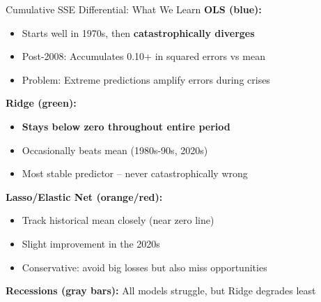\documentclass[10pt]{beamer}
\newcommand{\highlightgreen}[1]{\textcolor{AccentGreen}{\textbf{#1}}}
\newcommand{\highlightred}[1]{\textcolor{AccentRed}{\textbf{#1}}}
\begin{document}
\begin{frame}{Cumulative SSE Differential: What We Learn}
  \textbf{OLS (blue):}
  \begin{itemize}
    \item Starts well in 1970s, then \highlightred{catastrophically diverges}
    \item Post-2008: Accumulates 0.10+ in squared errors vs mean
    \item Problem: Extreme predictions amplify errors during crises
  \end{itemize}
  
  \vspace{0.5em}
  \textbf{Ridge (green):}
  \begin{itemize}
    \item \highlightgreen{Stays below zero throughout entire period}
    \item Occasionally beats mean (1980s-90s, 2020s)
    \item Most stable predictor -- never catastrophically wrong
  \end{itemize}
  
  \vspace{0.5em}
  \textbf{Lasso/Elastic Net (orange/red):}
  \begin{itemize}
    \item Track historical mean closely (near zero line)
    \item Slight improvement in the 2020s
    \item Conservative: avoid big losses but also miss opportunities
  \end{itemize}
  
  \vspace{0.5em}
  \textbf{Recessions (gray bars):} All models struggle, but Ridge degrades least
\end{frame}
\end{document}
